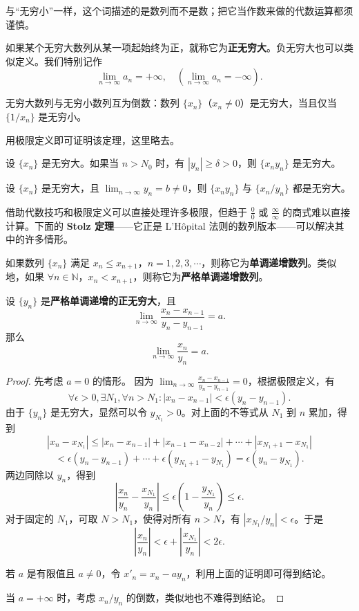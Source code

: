 与“无穷小”一样，这个词描述的是数列而不是数；把它当作数来做的代数运算都须谨慎。

如果某个无穷大数列从某一项起始终为正，就称它为\textbf{正无穷大}。负无穷大也可以类似定义。我们特别记作
\[
\lim_{n\to \infty}a_n=+\infty,\quad (\lim_{n\to \infty}a_n=-\infty).
\]

\begin{theorem}
无穷大数列与无穷小数列互为倒数：数列 $\{x_n\}$（$x_n\ne 0$）是无穷大，当且仅当 $\{1/x_n\}$ 是无穷小。
\end{theorem}
用极限定义即可证明该定理，这里略去。

\begin{theorem}
设 $\{x_n\}$ 是无穷大。如果当 $n>N_0$ 时，有 $|y_n|\ge \delta>0$，则 $\{x_ny_n\}$ 是无穷大。
\end{theorem}

\begin{inference}
设 $\{x_n\}$ 是无穷大，且 $\lim_{n\to \infty}y_n=b\ne 0$，则 $\{x_ny_n\}$ 与 $\{x_n/y_n\}$ 都是无穷大。
\end{inference}

借助代数技巧和极限定义可以直接处理许多极限，但趋于 $\frac{0}{0}$ 或 $\frac{\infty}{\infty}$ 的商式难以直接计算。下面的 \textbf{Stolz 定理}——它正是 L'Hôpital 法则的数列版本——可以解决其中的许多情形。

\begin{definition}[递增数列]
如果数列 $\{x_n\}$ 满足 $x_n\le x_{n+1}$，$n=1,2,3,\cdots$，则称它为\textbf{单调递增数列}。类似地，如果 $\forall n\in \mathbb{N}$，$x_n<x_{n+1}$，则称它为\textbf{严格单调递增数列}。
\end{definition}

\begin{theorem}
设 $\{y_n\}$ 是\textbf{严格单调递增的正无穷大}，且
\[
\lim_{n\to \infty}\frac{x_n-x_{n-1}}{y_n-y_{n-1}}=a.
\]
那么
\[
\lim_{n\to \infty}\frac{x_n}{y_n}=a.
\]
\end{theorem}

\begin{proof}
先考虑 $a=0$ 的情形。
因为 $\lim_{n\to \infty}\frac{x_n-x_{n-1}}{y_n-y_{n-1}}=0$，根据极限定义，有
\[
\forall \epsilon>0,\exists N_1,\forall n>N_1:|x_n-x_{n-1}|<\epsilon(y_n-y_{n-1}).
\]
由于 $\{y_n\}$ 是无穷大，显然可以令 $y_{N_1}>0$。对上面的不等式从 $N_1$ 到 $n$ 累加，得到
\[
|x_n-x_{N_1}|\le |x_n-x_{n-1}|+|x_{n-1}-x_{n-2}|+\cdots+|x_{N_1+1}-x_{N_1}|
\]
\[
<\epsilon(y_n-y_{n-1})+\cdots+\epsilon(y_{N_1+1}-y_{N_1})=\epsilon(y_n-y_{N_1}).
\]
两边同除以 $y_n$，得到
\[
\left|\frac{x_n}{y_n}-\frac{x_{N_1}}{y_n}\right|\le \epsilon\left(1-\frac{y_{N_1}}{y_n}\right)\le \epsilon.
\]
对于固定的 $N_1$，可取 $N>N_1$，使得对所有 $n>N$，有 $|x_{N_1}/y_n|<\epsilon$。于是
\[
\left|\frac{x_n}{y_n}\right|<\epsilon+\left|\frac{x_{N_1}}{y_n}\right|<2\epsilon.
\]

若 $a$ 是有限值且 $a\ne 0$，令 $x'_n=x_n-ay_n$，利用上面的证明即可得到结论。

当 $a=+\infty$ 时，考虑 $x_n/y_n$ 的倒数，类似地也不难得到结论。
\end{proof}

